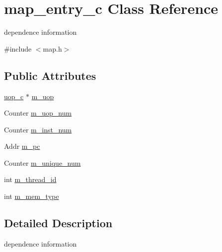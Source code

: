 \hypertarget{classmap__entry__c}{
\section{map\_\-entry\_\-c Class Reference}
\label{classmap__entry__c}
}


dependence information  




{\ttfamily \#include $<$map.h$>$}

\subsection*{Public Attributes}
\begin{DoxyCompactItemize}
\item 
\hyperlink{classuop__c}{uop\_\-c} $\ast$ \hyperlink{classmap__entry__c_ab6464a295f3c4c34ab222df2cd521b48}{m\_\-uop}
\item 
Counter \hyperlink{classmap__entry__c_a8652b806200144aa94a38f420aee08d2}{m\_\-uop\_\-num}
\item 
Counter \hyperlink{classmap__entry__c_ad89c46be260e96eac067256a202c9b5e}{m\_\-inst\_\-num}
\item 
Addr \hyperlink{classmap__entry__c_a9950a129015b7524a2623549f58aefcc}{m\_\-pc}
\item 
Counter \hyperlink{classmap__entry__c_a0a8a7d10cd323dd0df59c45f4af1e464}{m\_\-unique\_\-num}
\item 
int \hyperlink{classmap__entry__c_a3d60eba98c1ca2e9e41dc99ab84ae686}{m\_\-thread\_\-id}
\item 
int \hyperlink{classmap__entry__c_ac290f8ec57135c8a9570f9963cb0256c}{m\_\-mem\_\-type}
\end{DoxyCompactItemize}


\subsection{Detailed Description}
dependence information 


